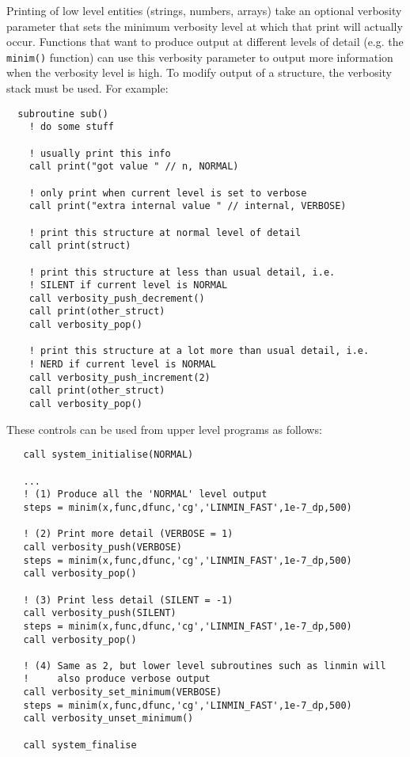 Printing of low level entities (strings, numbers, arrays) take an optional
verbosity parameter that sets the minimum verbosity level at which that
print will actually occur.  Functions that want to produce output at
different levels of detail (e.g. the \texttt{minim()} function) can use
this verbosity parameter to output more information when the verbosity
level is high.  To modify output of a structure, the verbosity stack
must be used.  For example:

\begin{boxedminipage}{\textwidth}
\begin{verbatim}
  subroutine sub()
    ! do some stuff

    ! usually print this info
    call print("got value " // n, NORMAL) 

    ! only print when current level is set to verbose
    call print("extra internal value " // internal, VERBOSE) 

    ! print this structure at normal level of detail
    call print(struct)

    ! print this structure at less than usual detail, i.e.
    ! SILENT if current level is NORMAL
    call verbosity_push_decrement()
    call print(other_struct)
    call verbosity_pop()

    ! print this structure at a lot more than usual detail, i.e.
    ! NERD if current level is NORMAL
    call verbosity_push_increment(2)
    call print(other_struct)
    call verbosity_pop()

\end{verbatim}
\end{boxedminipage}

These controls can be used from upper level programs as follows:

\begin{boxedminipage}{\textwidth}
\begin{verbatim}
   call system_initialise(NORMAL)

   ...
   ! (1) Produce all the 'NORMAL' level output
   steps = minim(x,func,dfunc,'cg','LINMIN_FAST',1e-7_dp,500)

   ! (2) Print more detail (VERBOSE = 1)
   call verbosity_push(VERBOSE)
   steps = minim(x,func,dfunc,'cg','LINMIN_FAST',1e-7_dp,500)
   call verbosity_pop()

   ! (3) Print less detail (SILENT = -1)
   call verbosity_push(SILENT)
   steps = minim(x,func,dfunc,'cg','LINMIN_FAST',1e-7_dp,500)
   call verbosity_pop()

   ! (4) Same as 2, but lower level subroutines such as linmin will 
   !     also produce verbose output
   call verbosity_set_minimum(VERBOSE)
   steps = minim(x,func,dfunc,'cg','LINMIN_FAST',1e-7_dp,500)
   call verbosity_unset_minimum()

   call system_finalise
\end{verbatim}
\end{boxedminipage}

